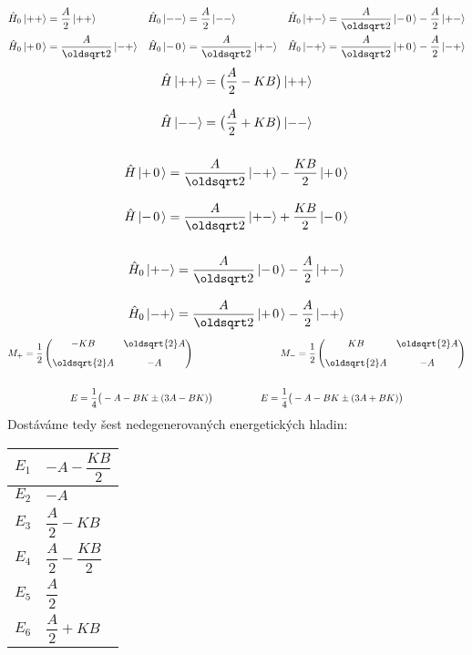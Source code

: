\documentclass[10pt,a4paper]{article}
\newcommand*{\mask}[2]{%
    \mathord{\makebox[\widthof{\(#1\)}]{\(#2\)}}%
}
\newcommand{\mat}[1]{
    \begin{pmatrix}
        #1
    \end{pmatrix}
}
\newcommand{\ket}[1]{\left| #1 \right>}
\def\0{\mask{+}{0}}
\begin{document}
\begin{align*}
    \hat H_0 \ket{++}
    &= \frac{A}{2} \ket{++}
    &
    \hat H_0 \ket{--}
    &= \frac{A}{2} \ket{--}
    &
    \hat H_0 \ket{+-}
    &= \frac{A}{\oldsqrt 2} \ket{-\0}
    - \frac{A}{2} \ket{+-}
    \\
    \hat H_0 \ket{+\0}
    &= \frac{A}{\oldsqrt 2} \ket{-+}
    &
    \hat H_0 \ket{-\0}
    &= \frac{A}{\oldsqrt 2} \ket{+-}
    &
    \hat H_0 \ket{-+}
    &= \frac{A}{\oldsqrt 2} \ket{+\0}
    - \frac{A}{2} \ket{-+}
\end{align*}
\begin{gather*}
    \hat H \ket{++} = \big( \frac{A}{2} - KB \big) \ket{++}
    \\[8pt]
    \hat H \ket{--} = \big( \frac{A}{2} + KB \big) \ket{--}
    \\[15pt]
    \hat H \ket {+\0} = \frac{A}{\oldsqrt 2} \ket{-+} - \frac{KB}{2} \ket{+\0}
    \\[8pt]
    \hat H \ket {-\0} = \frac{A}{\oldsqrt 2} \ket{+-} + \frac{KB}{2} \ket{-\0}
    \\[15pt]
    \hat H_0 \ket{+-} = \frac{A}{\oldsqrt 2} \ket{-\0} - \frac{A}{2} \ket{+-}
    \\[8pt]
    \hat H_0 \ket{-+} = \frac{A}{\oldsqrt 2} \ket{+\0} - \frac{A}{2} \ket{-+}
\end{gather*}
\begin{gather*}
    M_+ = \frac{1}{2} \mat{
        -KB & \oldsqrt{2} A \\[8pt]
        \oldsqrt{2} A & - A
    }
    \hspace{9em}
    M_- = \frac{1}{2} \mat{
        KB & \oldsqrt{2} A \\[8pt]
        \oldsqrt{2} A & - A
    }
    \\\\
    E = \frac{1}{4} \big(
        -A - BK \pm (3A - BK)
    \big)
    \hspace{5em}
    E = \frac{1}{4} \big(
        -A - BK \pm (3A + BK)
    \big)
\end{gather*}
Dostáváme tedy šest nedegenerovaných energetických hladin:
\begin{table}[h!]
    \centering
    \begin{tabular}{ r|l }
        $E_1$ \Huge \strut & $-A - \dfrac{KB}{2}$
        \\\hline
        $E_2$ \Huge \strut & $-A$
        \\\hline
        $E_3$ \Huge \strut & $\dfrac{A}{2} - KB$
        \\\hline
        $E_4$ \Huge \strut & $\dfrac{A}{2} - \dfrac{KB}{2}$
        \\\hline
        $E_5$ \Huge \strut & $\dfrac{A}{2}$
        \\\hline
        $E_6$ \Huge \strut & $\dfrac{A}{2} + KB$
    \end{tabular}
\end{table}
\end{document}
